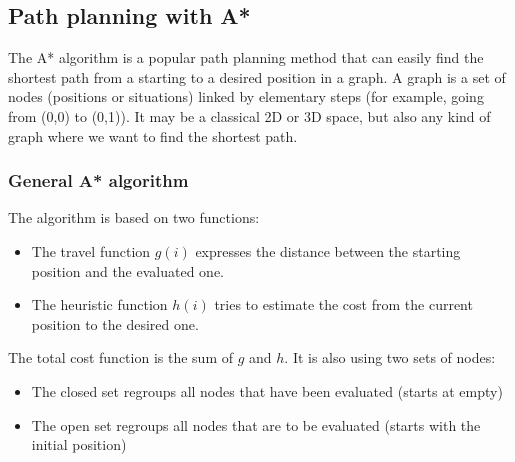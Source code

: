 \documentclass{ecnreport}
\begin{document}
\begin{itemize}
 \end{itemize}
 
 
 
 
 \subsection{Path planning with A*}
 
 The A* algorithm is a popular path planning method that can easily find the shortest path from a starting to a desired position in a graph. 
 A graph is a set of nodes (positions or situations) linked by elementary steps (for example, going from (0,0) to (0,1)). It may be a classical 2D or 3D space, but
 also any kind of graph where we want to find the shortest path. 
 
 \begin{itemize}
 \end{itemize}
 
 \subsubsection{General A* algorithm}
 The algorithm is based on two functions:
 \begin{itemize}
  \item The travel function $g(i)$ expresses the distance between the starting position and the evaluated one. 
  \item The heuristic function $h(i)$ tries to estimate the cost from the current position to the desired one. 
 \end{itemize}The total cost function is the sum of $g$ and $h$.
It is also using two sets of nodes:
\begin{itemize}
 \item The closed set regroups all nodes that have been evaluated (starts at empty)
 \item The open set regroups all nodes that are to be evaluated (starts with the initial position)
\end{itemize}
\end{document}
